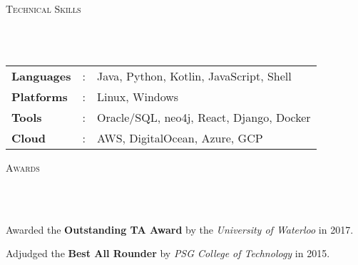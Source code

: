 \documentclass{article}
\newcommand{\header}[1]{{
\hspace*{-15pt}\vspace*{6pt} \textsc{#1}} \vspace*{-6pt} 
\lineunder
}
\newcommand{\lineunder}{
\vspace*{-8pt} \\ \hspace*{-18pt} 
\hrulefill \\
}
\renewcommand{\labelitemii}{
$\vcenter{\hbox{\tiny$\bullet$}}$\hspace*{-3pt}
}
\newenvironment{bullet-list-major}{
\begin{list}{\labelitemii}{\setlength\leftmargin{3pt} 
\topsep 0pt \itemsep -2pt}}{\vspace*{4pt}\end{list}
}
\begin{document}
\vspace*{4pt}%
\header{Technical Skills}
\begin{tabular}{l l l}

\textbf{Languages}&: & Java, Python, Kotlin, JavaScript, Shell\\
\textbf{Platforms}&:  & Linux, Windows\\
\textbf{Tools}&:     &Oracle/SQL, neo4j, React, Django, Docker\\
\textbf{Cloud}&:     &AWS, DigitalOcean, Azure, GCP
\end{tabular}


\vspace*{4pt}%
\header{Awards}
    \begin{bullet-list-major}
    \item Awarded the \textbf{Outstanding TA Award} by the \textit{University of Waterloo} in 2017.
    \item Adjudged the \textbf{Best All Rounder} by \textit{PSG College of Technology} in 2015.  
    \end{bullet-list-major}
\end{document}
